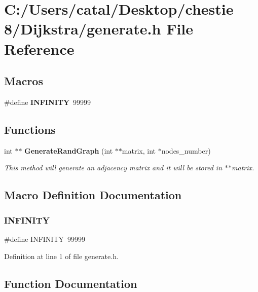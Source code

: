 \section{C\+:/\+Users/catal/\+Desktop/chestie 8/\+Dijkstra/generate.h File Reference}
\label{generate_8h}
\subsection*{Macros}
\begin{DoxyCompactItemize}
\item 
\#define \textbf{ I\+N\+F\+I\+N\+I\+TY}~99999
\end{DoxyCompactItemize}
\subsection*{Functions}
\begin{DoxyCompactItemize}
\item 
int $\ast$$\ast$ \textbf{ Generate\+Rand\+Graph} (int $\ast$$\ast$matrix, int $\ast$nodes\+\_\+number)
\begin{DoxyCompactList}\small\item\em This method will generate an adjacency matrix and it will be stored in $\ast$$\ast$matrix. \end{DoxyCompactList}\end{DoxyCompactItemize}


\subsection{Macro Definition Documentation}
\mbox{\label{generate_8h_a956e2723d559858d08644ac99146e910}} 
\subsubsection{I\+N\+F\+I\+N\+I\+TY}
{\footnotesize\ttfamily \#define I\+N\+F\+I\+N\+I\+TY~99999}



Definition at line 1 of file generate.\+h.



\subsection{Function Documentation}
\mbox{\label{generate_8h_a8d4ea219645520f49f17ec81bb16ef93}} 
